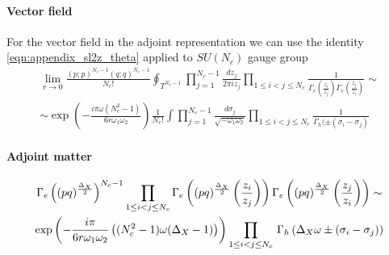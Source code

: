 \paragraph{Vector field}
\begin{comment}
\begin{multline}
 \prod_{1 \leq i <j \leq N_c} 
  \Gamma_e\left(  {z_i \over z_j} \right)\Gamma_e\left(  {z_j \over z_i} \right) 
  \,
  \sim  \\
 \sim \exp \bigg( {- \frac{i \pi} {6 r \omega_1 \omega_2 }  ( - N_c(N_c -1) \, \omega)}  \bigg)   \prod_{1 \leq i <j \leq N_c} 
\, \Gamma_h ( \pm ( \sigma_i - \sigma_j)) 
\end{multline}
\end{comment}
For the vector field in the adjoint representation we can use the identity \eqref{eqn:appendix_sl2z_theta} applied to $SU(N_c)$ gauge group
\begin{multline}
\lim_{r \rightarrow 0} \frac{ (p;p)^{N_c- 1}(q;q)^{N_c- 1} }{ N_c ! }
\oint_{T^{N_c -1}} \prod_{j=1}^{N_c -1 } \frac{ d z_j}{2 \pi i z_j} \prod_{1 \leq i<j \leq N_c } \frac{1}{\Gamma_e( \frac{z_i}{z_j} )\Gamma_e( \frac{z_j}{z_i} )} \sim
\\
\sim 
\exp \left(  
- \frac{ i \pi \omega (N_c^2 -1)}{6 r \omega_1 \omega_2}
\right)
 \frac{1}{N_c !} \int \prod_{j=1}^{N_c -1 } \frac{d \sigma_j}{\sqrt{- \omega_1 \omega_2} } \prod_{1 \leq i<j \leq N_c }\frac{1}{\Gamma_h( \pm (\sigma_i - \sigma_j) }
\end{multline}

\paragraph{Adjoint matter}

\begin{multline}
 \Gamma_e \left((pq)^{\frac{\Delta_X}{2}} \right)^{N_c -1} 
 \prod_{1 \leq i <j \leq N_c} 
\Gamma_e \left( (pq)^{\frac{\Delta_X}{2}} \left( { z_i \over z_j} \right) \right) \Gamma_e \left( (pq)^{\frac{\Delta_X}{2}} \left( { z_j \over z_i} \right) \right) \sim \\
 \exp \left(- \frac{i \pi} {6 r \omega_1 \omega_2 }  \left( (N_c^2-1) \omega (\Delta_X - 1)  \right) \right)   \prod_{1 \leq i <j \leq N_c} 
  \, \Gamma_h \left( \Delta_X \omega \pm (\sigma_i - \sigma_j) \right) 
\end{multline}


